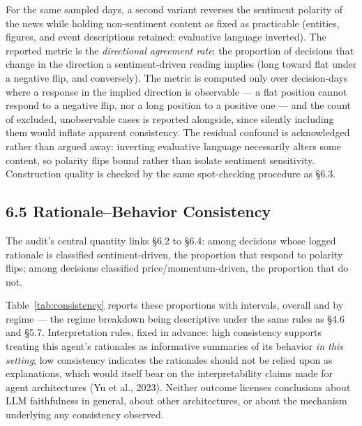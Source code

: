 \documentclass[
  12pt,
]{article}
\begin{document}
For the same sampled days, a second variant reverses the sentiment
polarity of the news while holding non-sentiment content as fixed as
practicable (entities, figures, and event descriptions retained;
evaluative language inverted). The reported metric is the
\emph{directional agreement rate}: the proportion of decisions that
change in the direction a sentiment-driven reading implies (long toward
flat under a negative flip, and conversely). The metric is computed only
over decision-days where a response in the implied direction is
observable --- a flat position cannot respond to a negative flip, nor a
long position to a positive one --- and the count of excluded,
unobservable cases is reported alongside, since silently including them
would inflate apparent consistency. The residual confound is
acknowledged rather than argued away: inverting evaluative language
necessarily alters some content, so polarity flips bound rather than
isolate sentiment sensitivity. Construction quality is checked by the
same spot-checking procedure as §6.3.

\hypertarget{rationalebehavior-consistency}{%
\subsection{6.5 Rationale--Behavior
Consistency}\label{rationalebehavior-consistency}}

The audit's central quantity links §6.2 to §6.4: among decisions whose
logged rationale is classified sentiment-driven, the proportion that
respond to polarity flips; among decisions classified
price/momentum-driven, the proportion that do not. 

\begin{table}[H]
\centering
{}
\caption{Consistency between stated rationale driver and behavioral response (placeholder; to be populated after experiments).}
\label{tab:consistency}
\end{table}

Table~\ref{tab:consistency} reports these proportions with intervals,
overall and by regime --- the regime breakdown being descriptive under
the same rules as §4.6 and §5.7. Interpretation rules, fixed in advance:
high consistency supports treating this agent's rationales as
informative summaries of its behavior \emph{in this setting}; low
consistency indicates the rationales should not be relied upon as
explanations, which would itself bear on the interpretability claims
made for agent architectures (Yu et al., 2023). Neither outcome licenses
conclusions about LLM faithfulness in general, about other
architectures, or about the mechanism underlying any consistency
observed.
\end{document}
